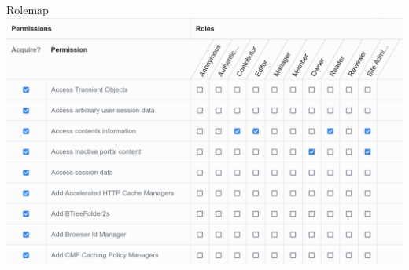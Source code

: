 \documentclass[12pt,aspectratio=169]{beamer}
\begin{document}
\begin{frame}{Rolemap}
  \includegraphics[width=0.95\columnwidth]{images/rolemap.png}
\end{frame}

\end{document}
